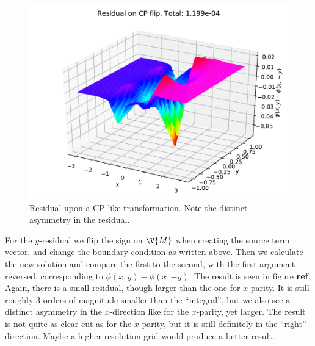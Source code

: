 \documentclass[sigconf]{acmart}
\begin{document}
\begin{figure}
	\includegraphics[width=\linewidth]{ex_res_y.pdf}
	\caption{Residual upon a CP-like transformation. Note the distinct asymmetry in the residual.}
	\label{fig:yres}
\end{figure}
For the $ y $-residual we flip the sign on $ \V{M} $ when creating the source term vector, and change the boundary condition as written above. Then we calculate the new solution and compare the first to the second, with the first argument reversed, corresponding to $ \phi(x,y)-\phi(x,-y) $. The result is seen in figure \textbf{ref}. Again, there is a small residual, though larger than the one for $ x $-parity. It is still roughly 3 orders of magnitude smaller than the ``integral'', but we also see a distinct asymmetry in the $ x $-direction like for the $ x $-parity, yet larger. The result is not quite as clear cut as for the $ x $-parity, but it is still definitely in the ``right'' direction. Maybe a higher resolution grid would produce a better result.
\end{document}
